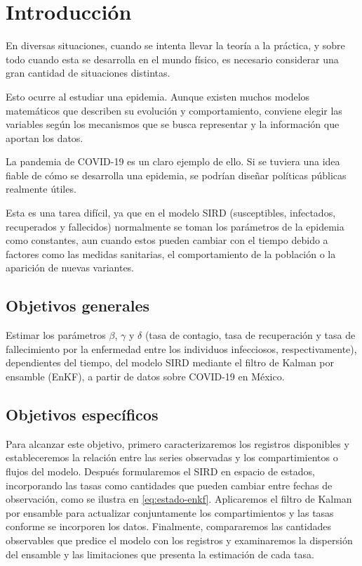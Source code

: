 \chapter{Introducción}

En diversas situaciones, cuando se intenta llevar la teoría a la práctica, y sobre todo cuando esta se desarrolla en el mundo físico, es necesario considerar una gran cantidad de situaciones distintas.

Esto ocurre al estudiar una epidemia. Aunque existen muchos modelos matemáticos que describen su evolución y comportamiento, conviene elegir las variables según los mecanismos que se busca representar y la información que aportan los datos.

La pandemia de COVID-19 es un claro ejemplo de ello. Si se tuviera una idea fiable de cómo se desarrolla una epidemia, se podrían diseñar políticas públicas realmente útiles.

Esta es una tarea difícil, ya que en el modelo SIRD (susceptibles, infectados, recuperados y fallecidos) normalmente se toman los parámetros de la epidemia como constantes, aun cuando estos pueden cambiar con el tiempo debido a factores como las medidas sanitarias, el comportamiento de la población o la aparición de nuevas variantes.

\section{Objetivos generales}


Estimar los parámetros $\beta$, $\gamma$ y $\delta$ (tasa de contagio, tasa de recuperación y tasa de fallecimiento por la enfermedad entre los individuos infecciosos, respectivamente), dependientes del tiempo, del modelo SIRD mediante el filtro de Kalman por ensamble (EnKF), a partir de datos sobre COVID-19 en México.

\section{Objetivos específicos}

Para alcanzar este objetivo, primero caracterizaremos los registros disponibles y estableceremos la relación entre las series observadas y los compartimientos o flujos del modelo. Después formularemos el SIRD en espacio de estados, incorporando las tasas como cantidades que pueden cambiar entre fechas de observación, como se ilustra en \eqref{eq:estado-enkf}. Aplicaremos el filtro de Kalman por ensamble para actualizar conjuntamente los compartimientos y las tasas conforme se incorporen los datos. Finalmente, compararemos las cantidades observables que predice el modelo con los registros y examinaremos la dispersión del ensamble y las limitaciones que presenta la estimación de cada tasa.


